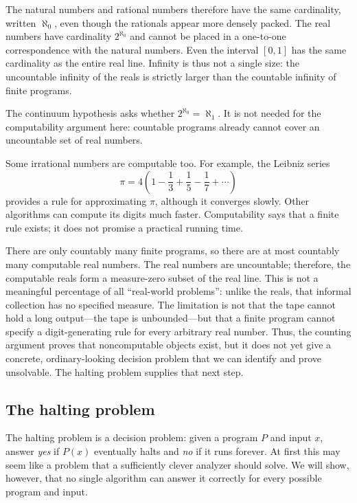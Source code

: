 \documentclass[11pt]{article}
\begin{document}
The natural numbers and rational numbers therefore have the same cardinality,
written $\aleph_0$, even though the rationals appear more densely packed. The
real numbers have cardinality $2^{\aleph_0}$ and cannot be placed in a
one-to-one correspondence with the natural numbers. Even the interval $[0,1]$
has the same cardinality as the entire real line. Infinity is thus not a single
size: the uncountable infinity of the reals is strictly larger than the
countable infinity of finite programs.

\begin{definition}
The continuum hypothesis asks whether $2^{\aleph_0}=\aleph_1$. It is not needed
for the computability argument here: countable programs already cannot cover an
uncountable set of real numbers.
\end{definition}

Some irrational numbers are computable too. For example, the Leibniz series
\[
  \pi=4\left(1-\frac13+\frac15-\frac17+\cdots\right)
\]
provides a rule for approximating $\pi$, although it converges slowly. Other
algorithms can compute its digits much faster. Computability says that a finite
rule exists; it does not promise a practical running time.

There are only countably many finite programs, so there are at most countably
many computable real numbers. The real numbers are uncountable; therefore,
the computable reals form a measure-zero subset of the real line. This is
not a meaningful percentage of all ``real-world problems'': unlike the reals,
that informal collection has no specified measure. The limitation is not that
the tape cannot hold a long output---the tape is unbounded---but that a finite
program cannot specify a digit-generating rule for every arbitrary real number.
Thus, the counting argument proves that noncomputable objects exist, but it
does not yet give a concrete, ordinary-looking decision problem that we can
identify and prove unsolvable. The halting problem supplies that next step.

\subsection{The halting problem}

The halting problem is a decision problem: given a program $P$ and input $x$,
answer \emph{yes} if $P(x)$ eventually halts and \emph{no} if it runs forever.
At first this may seem like a problem that a sufficiently clever analyzer
should solve. We will show, however, that no single algorithm can answer it
correctly for every possible program and input.
\end{document}
